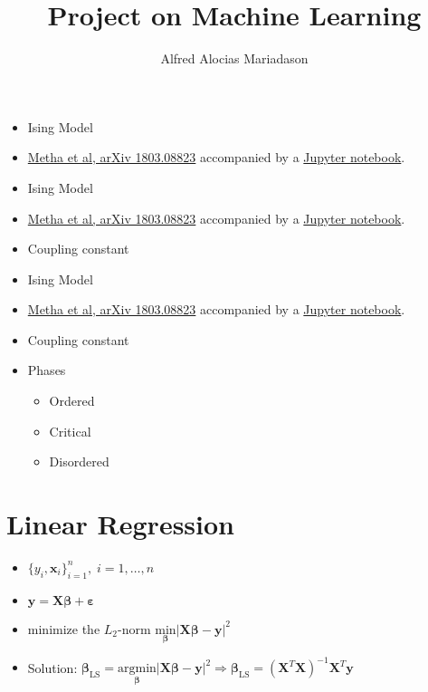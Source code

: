 \documentclass[11pt]{article}
\title{Project on Machine Learning}
\author{Alfred Alocias Mariadason}
\begin{document}
    
\maketitle
    
\newpage
\begin{itemize}
    \item Ising Model
    \item \href{https://arxiv.org/pdf/1803.08823.pdf}{Metha et al, arXiv
        1803.08823} accompanied by a
        \href{https://physics.bu.edu/~pankajm/MLnotebooks.html}{Jupyter
        notebook}.
\end{itemize}

\newpage
\begin{itemize}
    \item Ising Model
    \item \href{https://arxiv.org/pdf/1803.08823.pdf}{Metha et al, arXiv
        1803.08823} accompanied by a
        \href{https://physics.bu.edu/~pankajm/MLnotebooks.html}{Jupyter
        notebook}.
    \item Coupling constant 
\end{itemize}

\newpage
\begin{itemize}
    \item Ising Model
    \item \href{https://arxiv.org/pdf/1803.08823.pdf}{Metha et al, arXiv
        1803.08823} accompanied by a
        \href{https://physics.bu.edu/~pankajm/MLnotebooks.html}{Jupyter
        notebook}.
    \item Coupling constant 
    \item Phases
        \begin{itemize}
            \item Ordered
            \item Critical
            \item Disordered
        \end{itemize}
\end{itemize}

\newpage
\hypertarget{linear-regression}{%
\section*{Linear Regression}\label{linear-regression}}

\begin{itemize}
    \item $\{y_i, \boldsymbol{x}_i\}_{i=1}^n,\; i=1,\dots,n$
    \item $\boldsymbol{y} = \boldsymbol{X}\boldsymbol{\beta} + \boldsymbol{\varepsilon}$
    \item minimize the \(L_2\)-norm $\underset{\boldsymbol{\beta}}{\text{min}}{\big|}\boldsymbol{X}\boldsymbol{\beta} - \boldsymbol{y}{\big|}^2$
    \item Solution: $\boldsymbol{\beta}_{\text{LS}} = \underset{\boldsymbol{\beta}}{\text{arg}\text{min}}{\big|}\boldsymbol{X}\boldsymbol{\beta} - \boldsymbol{y}{\big|}^2 \Rightarrow \boldsymbol{\beta}_{\text{LS}} = \left(\boldsymbol{X}^T\boldsymbol{X}\right)^{-1}\boldsymbol{X}^T\boldsymbol{y}$
\end{itemize}
\end{document}
